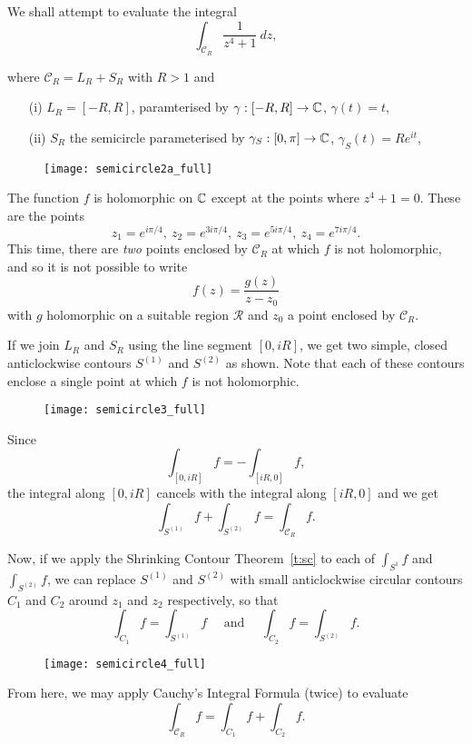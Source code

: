 \begin{frame}

\begin{example}
\label{e:gdef}
We shall attempt to evaluate the integral
\[
\int_{\mathcal{C}_R} \frac{1}{z^4+1}\ dz,
\]
\end{example}
where $\mathcal{C}_R=L_R+S_R$ with $R>1$ and
\begin{enumerate}
\item[(i)] $L_R=[-R,R]$, paramterised by $\gamma:[-R,R] \to \mathbb{C}$, $\gamma (t)=t$, 
\item[(ii)] $S_R$ the semicircle parameterised by $\gamma_S:[0,\pi] \to \mathbb{C}$, $\gamma_S (t)=Re^{it}$,
\end{enumerate}
\begin{comment}
Then we have
\[
\int_{\mathcal{C}_R} f = \int_{L_R} f + \int_{S_R} f.
\]
\end{comment}
\end{frame}
\begin{wrapfigure}{r}[2cm]{0.4\textwidth}
\texttt{[image: semicircle2a\_full]}
\end{wrapfigure}The function $f$ is holomorphic on $\mathbb{C}$ except at the points where $z^4+1=0$.  These are the points
\[
z_1=e^{i\pi/4},\ z_2=e^{3i\pi/4},\ z_3=e^{5i\pi/4},\ z_4=e^{7i\pi/4}.
\]
This time, there are \emph{two} points enclosed by $\mathcal{C}_R$ at which $f$ is not holomorphic, and so it is not possible to write
\[
f(z)=\frac{g(z)}{z-z_0}
\]
with $g$ holomorphic on a suitable region $\mathcal{R}$ and $z_0$ a point enclosed by $\mathcal{C}_R$.


If we join $L_R$ and $S_R$ using the line segment $[0,iR]$, we get two simple, closed anticlockwise contours $S^{(1)}$ and $S^{(2)}$ as shown.  Note that each of these contours enclose a single point at which $f$ is not holomorphic.
\begin{figure}[H]
\centerline{\texttt{[image: semicircle3\_full]}}%
\end{figure}
Since 
\[
\int_{[0,iR]} f = - \int_{[iR,0]} f,
\]
the integral along $[0,iR]$ cancels with the integral along $[iR,0]$ and we get
\[
\int_{S^{(1)}} f + \int_{S^{(2)}} f = \int_{\mathcal{C}_R} f.
\]

Now, if we apply the Shrinking Contour Theorem~\ref{t:sc} to each of $\int_{S^{1}} f$ and $\int_{S^{(2)}} f$, we can replace $S^{(1)}$ and $S^{(2)}$ with small anticlockwise circular contours $C_1$ and $C_2$ around $z_1$ and $z_2$ respectively, so that
\[
\int_{C_1} f = \int_{S^{(1)}} f \quad \text{ and }\quad \int_{C_2} f = \int_{S^{(2)}} f.
\]
\begin{figure}[H]
\centering
\texttt{[image: semicircle4\_full]}
\end{figure}
From here, we may apply Cauchy's Integral Formula (twice) to evaluate
\[
\int_{\mathcal{C}_R} f = \int_{C_1} f + \int_{C_2} f.
\]

